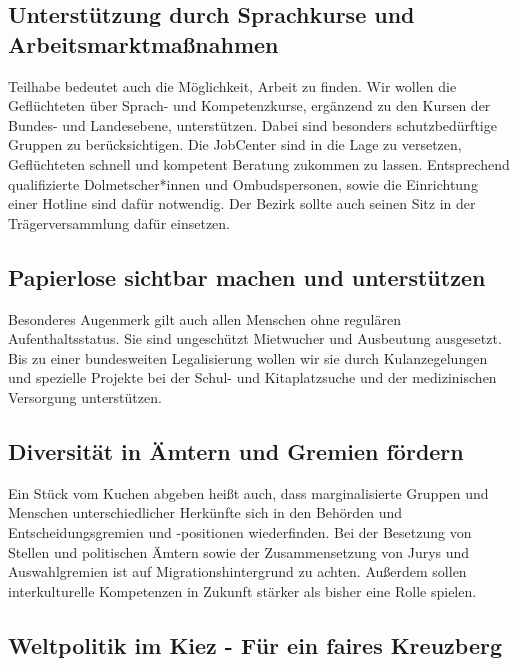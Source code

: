 \documentclass[a4paper,10pt]{article}
\begin{document}
\subsection*{\ttfamily Unterstützung durch Sprachkurse und
Arbeitsmarktmaßnahmen}\label{unterstuxfctzung-durch-sprachkurse-und-arbeitsmarktmauxdfnahmen}

Teilhabe bedeutet auch die Möglichkeit, Arbeit zu finden. Wir wollen die
Geflüchteten über Sprach- und Kompetenzkurse, ergänzend zu den Kursen
der Bundes- und Landesebene, unterstützen. Dabei sind besonders
schutzbedürftige Gruppen zu berücksichtigen. Die JobCenter sind in die
Lage zu versetzen, Geflüchteten schnell und kompetent Beratung zukommen
zu lassen. Entsprechend qualifizierte Dolmetscher*innen und
Ombudspersonen, sowie die Einrichtung einer Hotline sind dafür
notwendig. Der Bezirk sollte auch seinen Sitz in der Trägerversammlung
dafür einsetzen.

\subsection*{\ttfamily Papierlose sichtbar machen und
unterstützen}\label{papierlose-sichtbar-machen-und-unterstuxfctzen}

Besonderes Augenmerk gilt auch allen Menschen ohne regulären
Aufenthaltsstatus. Sie sind ungeschützt Mietwucher und Ausbeutung
ausgesetzt. Bis zu einer bundesweiten Legalisierung wollen wir sie durch
Kulanzegelungen und spezielle Projekte bei der Schul- und Kitaplatzsuche
und der medizinischen Versorgung unterstützen.

\subsection*{\ttfamily Diversität in Ämtern und Gremien
fördern}\label{diversituxe4t-in-uxe4mtern-und-gremien-fuxf6rdern}

Ein Stück vom Kuchen abgeben heißt auch, dass marginalisierte Gruppen
und Menschen unterschiedlicher Herkünfte sich in den Behörden und
Entscheidungsgremien und -positionen wiederfinden. Bei der Besetzung von
Stellen und politischen Ämtern sowie der Zusammensetzung von Jurys und
Auswahlgremien ist auf Migrationshintergrund zu achten. Außerdem sollen
interkulturelle Kompetenzen in Zukunft stärker als bisher eine Rolle
spielen.

\subsection*{\ttfamily Weltpolitik im Kiez - Für ein faires
Kreuzberg}\label{weltpolitik-im-kiez---fuxfcr-ein-faires-kreuzberg}
\end{document}
